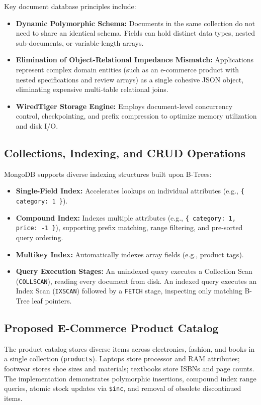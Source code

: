 \documentclass[12pt,a4paper]{report}
\begin{document}
Key document database principles include:
\begin{itemize}
    \item \textbf{Dynamic Polymorphic Schema:} Documents in the same collection do not need to share an identical schema. Fields can hold distinct data types, nested sub-documents, or variable-length arrays.
    \item \textbf{Elimination of Object-Relational Impedance Mismatch:} Applications represent complex domain entities (such as an e-commerce product with nested specifications and review arrays) as a single cohesive JSON object, eliminating expensive multi-table relational joins.
    \item \textbf{WiredTiger Storage Engine:} Employs document-level concurrency control, checkpointing, and prefix compression to optimize memory utilization and disk I/O.
\end{itemize}

\subsection{Collections, Indexing, and CRUD Operations}
MongoDB supports diverse indexing structures built upon B-Trees:
\begin{itemize}
    \item \textbf{Single-Field Index:} Accelerates lookups on individual attributes (e.g., \texttt{\{ category: 1 \}}).
    \item \textbf{Compound Index:} Indexes multiple attributes (e.g., \texttt{\{ category: 1, price: -1 \}}), supporting prefix matching, range filtering, and pre-sorted query ordering.
    \item \textbf{Multikey Index:} Automatically indexes array fields (e.g., product tags).
    \item \textbf{Query Execution Stages:} An unindexed query executes a Collection Scan (\texttt{COLLSCAN}), reading every document from disk. An indexed query executes an Index Scan (\texttt{IXSCAN}) followed by a \texttt{FETCH} stage, inspecting only matching B-Tree leaf pointers.
\end{itemize}

\subsection{Proposed E-Commerce Product Catalog}
The product catalog stores diverse items across electronics, fashion, and books in a single collection (\texttt{products}). Laptops store processor and RAM attributes; footwear stores shoe sizes and materials; textbooks store ISBNs and page counts. The implementation demonstrates polymorphic insertions, compound index range queries, atomic stock updates via \texttt{\$inc}, and removal of obsolete discontinued items.
\end{document}
